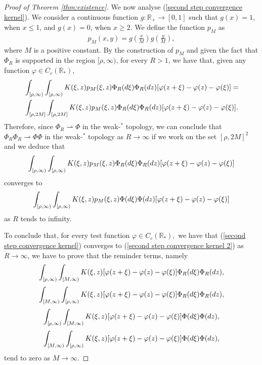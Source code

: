 \documentclass[11pt]{article}
\numberwithin{equation}{section}
\theoremstyle{plain}
\newcommand{\der}{\textup{d}}
\begin{document}
\begin{proof}[Proof of Theorem \ref{thm:existence}]
We now analyse (\ref{second step convergence kernel}). We consider a continuous function $g: \mathbb R_+ \rightarrow [0, 1] $ such that $g(x)=1$, when $x\leq 1$, and $g(x)=0$, when $x \geq 2$. 
We define the function $p_M $ as  
\begin{align} \label{p_M}
p_{M}(x,y)=g\left(\frac{x}{M}\right)g\left(\frac{y}{M}\right),
\end{align}
where $M$ is a positive constant.
By the construction of $p_{M}$ and given the fact that $\Phi_{R}$ is supported in the region $[\rho,\infty)$, for every $R>1$, we have that, given any function $\varphi \in C_c(\mathbb R_*)$, 
\begin{align*}
    &\int_{[\rho,\infty)}\int_{[\rho,\infty)}K(\xi,z)p_{M}(\xi,z)\Phi_{R}(\der \xi)\Phi_{R}(\der z)[\varphi(z+\xi)-\varphi(z)-\varphi(\xi)]=\\
     &\int_{[\rho,2M]}\int_{[\rho,2M]}K(\xi,z)p_{M}(\xi,z)\Phi_{R}(\der \xi)\Phi_{R}(\der z)[\varphi(z+\xi)-\varphi(z)-\varphi(\xi)].
\end{align*}
Therefore, since $\Phi_R \rightharpoonup \Phi $ in the weak-$^{\ast}$ topology, we can conclude that $\Phi_R \Phi_{R}\rightharpoonup \Phi \Phi $ in the weak-$^{\ast}$ topology as $R\rightarrow\infty$ if we work on the set $[\rho,2M]^{2}$ and we deduce that 
\begin{align*}
    \int_{[\rho,\infty)}\int_{[\rho,\infty)}K(\xi,z)p_{M}(\xi,z)\Phi_{R}(\der \xi)\Phi_{R}(\der z)[\varphi(z+\xi)-\varphi(z)-\varphi(\xi)]
\end{align*}
converges to
\begin{align*}
    \int_{[\rho,\infty)}\int_{[\rho,\infty)}K(\xi,z)p_{M}(\xi,z)\Phi(\der \xi)\Phi(\der z)[\varphi(z+\xi)-\varphi(z)-\varphi(\xi)]
\end{align*}
as $R $ tends to infinity. 

To conclude that, for every test function $\varphi \in C_c(\mathbb R_*), $ we have that (\ref{second step convergence kernel}) converges to (\ref{second step convergence kernel 2}) as $R  \rightarrow \infty$, we have to prove that the reminder terms, namely
\begin{equation}\label{reminder1}
\int_{[\rho,\infty)}\int_{[M,\infty)}K(\xi,z)[\varphi(z+\xi)-\varphi(z)-\varphi(\xi)]\Phi_{R}(\der \xi)\Phi_{R}(\der z),
\end{equation}
\begin{equation} \label{reminder2}
\int_{[M,\infty)}\int_{[\rho,\infty)}K(\xi, z) [\varphi(z+\xi)-\varphi(z)-\varphi(\xi)]\Phi_{R}(\der \xi)\Phi_{R}(\der z),
\end{equation}
\begin{equation}\label{reminder3}
\int_{[\rho,\infty)}\int_{[M,\infty)}K(\xi,z)[\varphi(z+\xi)-\varphi(z)-\varphi(\xi)]\Phi(\der \xi)\Phi(\der z),
\end{equation}
\begin{equation} \label{reminder4}
\int_{[M,\infty)}\int_{[\rho,\infty)}K(\xi, z) [\varphi(z+\xi)-\varphi(z)-\varphi(\xi)]\Phi(\der \xi)\Phi(\der z),
\end{equation}
tend to zero as $M\rightarrow\infty$.


\end{proof}
\end{document}
